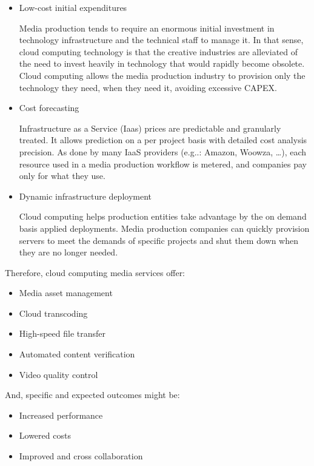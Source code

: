 \begin{itemize}
\item Low-cost initial expenditures \hfill 

Media production tends to require an enormous initial investment in technology infrastructure and the technical staff to manage it. In that sense, cloud computing technology is that the creative industries are alleviated of the need to invest heavily in technology that would rapidly become obsolete. Cloud computing allows the media production industry to provision only the technology they need, when they need it, avoiding excessive CAPEX.

\item Cost forecasting\hfill 

Infrastructure as a Service (Iaas) prices are predictable and granularly treated. It allows prediction on a per project basis with detailed cost analysis precision. As done by many IaaS providers (e.g..: Amazon, Woowza, \ldots), each resource used in a media production workflow is metered, and companies pay only for what they use.

\item Dynamic infrastructure deployment \hfill 

Cloud computing helps production entities take advantage by the on demand basis applied deployments. Media production companies can quickly provision servers to meet the demands of specific projects and shut them down when they are no longer needed.
\end{itemize}

Therefore, cloud computing media services offer:

\begin{itemize}
\item Media asset management
\item Cloud transcoding
\item High-speed file transfer
\item Automated content verification
\item Video quality control
\end{itemize}

And, specific and expected outcomes might be:

\begin{itemize}
\item Increased performance
\item Lowered costs
\item Improved and cross collaboration
\end{itemize}

